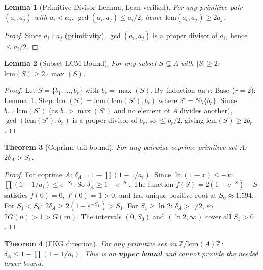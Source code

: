 \documentclass[11pt,a4paper]{article}
\newtheorem{theorem}{Theorem}
\newtheorem{lemma}[theorem]{Lemma}
\theoremstyle{definition}
\begin{document}
\begin{lemma}[Primitive Divisor Lemma, Lean-verified]\label{lem:pdl}
For any primitive pair $(a_i, a_j)$ with $a_i < a_j$:
$\gcd(a_i, a_j) \leq a_i/2$, hence $\mathrm{lcm}(a_i, a_j) \geq 2a_j$.
\end{lemma}

\begin{proof}
Since $a_i \nmid a_j$ (primitivity), $\gcd(a_i,a_j)$ is a proper divisor
of $a_i$, hence $\leq a_i/2$.
\end{proof}

\begin{lemma}[Subset LCM Bound]\label{lem:lcm-subset}
For any subset $S \subseteq A$ with $|S| \geq 2$:
$\mathrm{lcm}(S) \geq 2 \cdot \max(S)$.
\end{lemma}

\begin{proof}
Let $S = \{b_1, \ldots, b_r\}$ with $b_r = \max(S)$. By induction on $r$:
Base ($r=2$): Lemma~\ref{lem:pdl}. Step: $\mathrm{lcm}(S) =
\mathrm{lcm}(\mathrm{lcm}(S'), b_r)$ where $S' = S \setminus \{b_r\}$.
Since $b_r \nmid \mathrm{lcm}(S')$ (as $b_r > \max(S')$ and no element
of $A$ divides another), $\gcd(\mathrm{lcm}(S'), b_r)$ is a proper divisor
of $b_r$, so $\leq b_r/2$, giving $\mathrm{lcm}(S) \geq 2b_r$.
\end{proof}

\begin{theorem}[Coprime tail bound]\label{thm:coprime-tail}
For any pairwise coprime primitive set $A$: $2\delta_A > S_1$.
\end{theorem}

\begin{proof}
For coprime $A$: $\delta_A = 1 - \prod(1 - 1/a_i)$. Since
$\ln(1-x) \leq -x$: $\prod(1-1/a_i) \leq e^{-S_1}$.
So $\delta_A \geq 1 - e^{-S_1}$. The function $f(S) = 2(1-e^{-S}) - S$
satisfies $f(0)=0$, $f'(0) = 1 > 0$, and has unique positive root at
$S_0 \approx 1.594$. For $S_1 < S_0$: $2\delta_A \geq 2(1-e^{-S_1}) > S_1$.
For $S_1 \geq \ln 2$: $\delta_A > 1/2$, so $2G(n) > 1 > G(m)$.
The intervals $(0, S_0)$ and $(\ln 2, \infty)$ cover all $S_1 > 0$.
\end{proof}

\begin{theorem}[FKG direction]\label{thm:fkg}
For any primitive set on $\mathbb{Z}/\mathrm{lcm}(A)\mathbb{Z}$:
$\delta_A \leq 1 - \prod(1-1/a_i)$. This is an \textbf{upper bound}
and cannot provide the needed lower bound.
\end{theorem}
\end{document}
